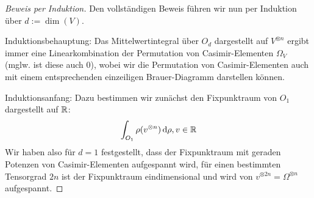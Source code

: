 \begin{proof}[Beweis per Induktion]
\medbreak
Den vollständigen Beweis führen wir nun per Induktion über $d:=\dim(V)$.

Induktionsbehauptung: 
Das Mittelwertintegral über $O_d$ dargestellt auf $V^{\otimes n}$ ergibt immer eine Linearkombination der Permutation von Casimir-Elementen $\Omega_{V}$ (mglw. ist diese auch $0$), wobei wir die Permutation von Casimir-Elementen auch mit einem entsprechenden einzeiligen Brauer-Diagramm darstellen können.
 
Induktionsanfang:
Dazu bestimmen wir zunächst den Fixpunktraum von $O_1$ dargestellt auf $\mathbb{R}$:
\[
\int_{O_1} \rho (v^{\otimes n}) \,\textrm{d} \rho, v\in\mathbb{R}
\]
Wir haben also für $d=1$ festgestellt, dass der Fixpunktraum mit geraden Potenzen von Casimir-Elementen aufgespannt wird, für einen bestimmten Tensorgrad $2n$ ist der Fixpunktraum eindimensional und wird von $v^{\otimes 2n}=\Omega^{\otimes n}$ aufgespannt.


\end{proof}
